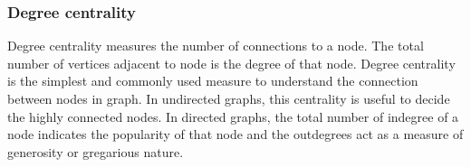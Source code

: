 



\subsubsection{Degree centrality}
%
Degree centrality measures the number of connections to a node.
The total number of vertices adjacent to node is the degree of that
node. Degree centrality is the simplest and commonly used measure to understand 
the connection between nodes in graph. In undirected graphs, this
centrality is useful to decide the highly connected nodes.
In directed graphs, the total number of indegree of a node indicates the
popularity of that node and the outdegrees act as a measure of
generosity or gregarious nature. 


